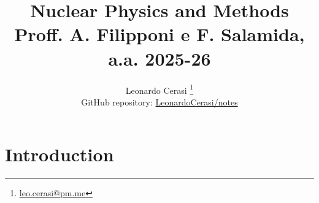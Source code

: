 \documentclass[a4paper, 12pt]{book}
\title{\Huge\textbf{Nuclear Physics and Methods} \\ \large Proff. A. Filipponi e F. Salamida, a.a. 2025-26}
\author{Leonardo Cerasi%
	\thanks{\scriptsize\href{mailto:leo.cerasi@pm.me}{leo.cerasi@pm.me}} \\
	\small GitHub repository: \href{https://github.com/LeonardoCerasi/notes}{LeonardoCerasi/notes}}
\date{}
\begin{document}
\frontmatter

\maketitle

\toc

\pagestyle{contents}

\mainmatter

\pagestyle{introd}
\chapter{Introduction}

\end{document}
